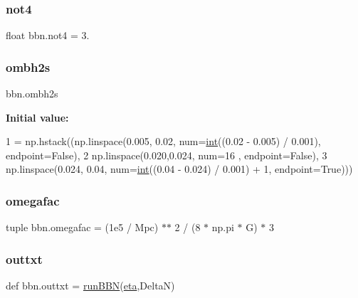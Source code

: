 \mbox{\label{namespacebbn_a9ea8fb09e803dade7572cbbf146631cc}} 
\subsubsection{\texorpdfstring{not4}{not4}}
{\footnotesize\ttfamily float bbn.\+not4 = 3.}

\mbox{\label{namespacebbn_abfcfac0d0a6f15787c1f9bf37b990133}} 
\subsubsection{\texorpdfstring{ombh2s}{ombh2s}}
{\footnotesize\ttfamily bbn.\+ombh2s}

{\bfseries Initial value\+:}
\begin{DoxyCode}
1 =  np.hstack((np.linspace(0.005, 0.02, num=\mbox{\hyperlink{namespaceCAMB__test__files_ae3f939a649209ec8d0004b0dfef3210b}{int}}((0.02 - 0.005) / 0.001), endpoint=\textcolor{keyword}{False}),
2          np.linspace(0.020,0.024, num=16 , endpoint=\textcolor{keyword}{False}),
3          np.linspace(0.024, 0.04, num=\mbox{\hyperlink{namespaceCAMB__test__files_ae3f939a649209ec8d0004b0dfef3210b}{int}}((0.04 - 0.024) / 0.001) + 1, endpoint=\textcolor{keyword}{True})))
\end{DoxyCode}
\mbox{\label{namespacebbn_a7add864cda923ca0a40fda7711df51d5}} 
\subsubsection{\texorpdfstring{omegafac}{omegafac}}
{\footnotesize\ttfamily tuple bbn.\+omegafac = (1e5 / Mpc) $\ast$$\ast$ 2 / (8 $\ast$ np.\+pi $\ast$ G) $\ast$ 3}

\mbox{\label{namespacebbn_a7379640051724fc37488eeefda65ad65}} 
\subsubsection{\texorpdfstring{outtxt}{outtxt}}
{\footnotesize\ttfamily def bbn.\+outtxt = \mbox{\hyperlink{namespacebbn_ae72b1fc1114a29eb8f18c248cf2809a2}{run\+B\+BN}}(\mbox{\hyperlink{namespacebbn_ace64c472b0c59f5fd0f811cd4dcdc2b4}{eta}},DeltaN)}

